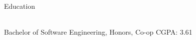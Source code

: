 \documentclass{resume} %
\begin{document}

\begin{rSection}{Education}

\vspace{-0.75em}
\\ Bachelor of Software Engineering, Honors, Co-op \hfill {CGPA: 3.61 } 

\end{rSection}
\end{document}
